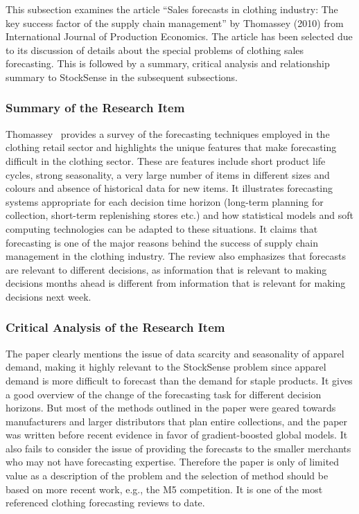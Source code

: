 \documentclass{StockSense}
\begin{document}
This subsection examines the article “Sales forecasts in clothing industry: The key success factor of the supply chain management” by Thomassey (2010) from International Journal of Production Economics. The article has been selected due to its discussion of details about the special problems of clothing sales forecasting. This is followed by a summary, critical analysis and relationship summary to StockSense in the subsequent subsections.

\subsubsection{Summary of the Research Item}

Thomassey~\cite{thomassey2010sales} provides a survey of the forecasting techniques employed in the clothing retail sector and highlights the unique features that make forecasting difficult in the clothing sector. These are features include short product life cycles, strong seasonality, a very large number of items in different sizes and colours and absence of historical data for new items. It illustrates forecasting systems appropriate for each decision time horizon (long-term planning for collection, short-term replenishing stores etc.) and how statistical models and soft computing technologies can be adapted to these situations. It claims that forecasting is one of the major reasons behind the success of supply chain management in the clothing industry. The review also emphasizes that forecasts are relevant to different decisions, as information that is relevant to making decisions months ahead is different from information that is relevant for making decisions next week.

\subsubsection{Critical Analysis of the Research Item}

The paper clearly mentions the issue of data scarcity and seasonality of apparel demand, making it highly relevant to the StockSense problem since apparel demand is more difficult to forecast than the demand for staple products. It gives a good overview of the change of the forecasting task for different decision horizons. But most of the methods outlined in the paper were geared towards manufacturers and larger distributors that plan entire collections, and the paper was written before recent evidence in favor of gradient-boosted global models. It also fails to consider the issue of providing the forecasts to the smaller merchants who may not have forecasting expertise. Therefore the paper is only of limited value as a description of the problem and the selection of method should be based on more recent work, e.g., the M5 competition. It is one of the most referenced clothing forecasting reviews to date.
\end{document}
